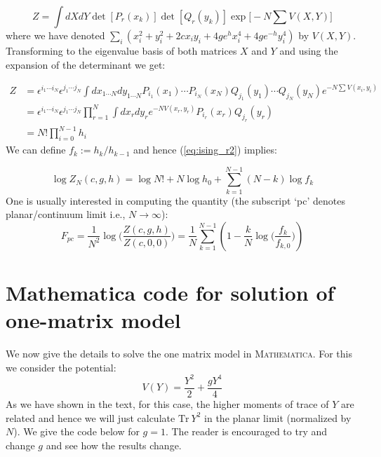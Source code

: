 \documentclass[11pt]{article}
\begin{document}
\begin{equation}
	Z = \int dX dY \det[P_{r}(x_k)] \det[Q_{r}(y_k)] \exp\Big[-N \sum V(X,Y)\Big]
\end{equation}
where we have denoted $\sum_{i} (x_{i}^2 + y_{i}^{2} +2c x_{i}y_{i} + 4ge^{h}x_{i}^{4} + 4ge^{-h}y_{i}^4)$ by $V(X,Y)$. Transforming to the eigenvalue basis of both matrices $X$ and $Y$ and using the expansion of the determinant we get:

\begin{align}
	Z &= \epsilon^{i_1 \cdots i_N} \epsilon^{j_1 \cdots j_N} \int dx_{1 \cdots N}
	dy_{1 \cdots N} P_{i_{1}}(x_1) \cdots P_{i_{N}}(x_N)
	Q_{j_{1}}(y_1) \cdots Q_{j_{N}}(y_N)
	e^{-N \sum V(x_i,y_i)} \nonumber  \\  
	&= \epsilon^{i_1 \cdots i_N} \epsilon^{j_1 \cdots j_N} \prod_{r=1}^{N} \int dx_{r} dy_{r} e^{-N V(x_r, y_r)} P_{i_r}(x_r) Q_{j_r}(y_r) \nonumber  \\  
	&=  N! \prod_{i=0}^{N-1} h_{i} 
	\label{eq:ising_r2}
\end{align}
We can define $f_{k} := h_k/h_{k-1}$ and hence 
(\ref{eq:ising_r2}) implies:

\begin{equation}
	\log Z_{N}(c,g,h) = \log N! + N \log h_0 + \sum_{k=1}^{N-1} (N-k) \log f_{k} 
\end{equation}
One is usually interested in computing the quantity (the subscript `pc' denotes planar/continuum limit i.e., $ N \to \infty$):
\begin{equation}
	F_{pc} = \frac{1}{N^2} \log\Bigg( \frac{Z(c,g,h)}{Z(c,0,0)}\Bigg) = \frac{1}{N} \sum_{k=1}^{N-1} \left(1 - \frac{k}{N} \log \Big(\frac{f_k}{f_{k,0}}\Big)\right)
\end{equation}




\section{Mathematica code for solution of one-matrix model}
We now give the details to solve the one matrix model in \textsc{Mathematica}. For this we consider the potential:
\[ V(Y) = \frac{Y^2}{2} + \frac{gY^4}{4} \] 
As we have shown in the text, for this case, the higher moments of trace of $Y$ are related and hence we will just calculate $\mbox{Tr}~Y^2$ in the planar limit (normalized by $N$). We give the code below for $g=1$. The reader is encouraged to try and change $g$ and see how the results change.
\end{document}

